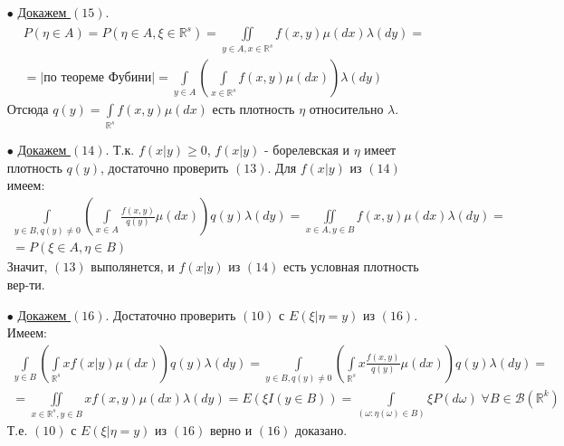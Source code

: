\begin{Proof}
	\begin{itemize}
		\item[$\bullet$] 
			\underline{Докажем $(15)$}.
			$$\begin{gathered}
				P(\eta \in A) = P(\eta \in A, \xi \in \mathbb{R}^s) = \underset{y \in A, x \in \mathbb{R}^s}{\overset{}{\iint}}f(x,y)\mu(d x) \lambda(d y) = \\
				= \Big|\text{по теореме Фубини}\Big| = \underset{y \in A}{\overset{}{\int}}\left( \underset{x \in \mathbb{R}^s}{\overset{}{\int}}f(x,y)\mu (d x) \right) \lambda (d y)
			\end{gathered}$$
			Отсюда $\displaystyle q(y) = \underset{\mathbb{R}^s}{\overset{}{\int}}f(x,y)\mu (d x)$ есть плотность $\eta$ относительно $\lambda$.
		\item[$\bullet$]
			\underline{Докажем $(14)$}.
			Т.к. $f(x|y) \ge 0$, $f(x|y)$ - борелевская и $\eta$ имеет плотность $q(y)$, достаточно проверить $(13)$. Для $f(x|y)$ из $(14)$ имеем:
			$$\begin{gathered}
				\underset{y \in B, q(y) \not = 0}{\overset{}{\int}}\left( \underset{x \in A}{\overset{}{\int}}\frac{f(x,y)}{q(y)}\mu (d x) \right) q(y) \lambda (d y) = \underset{x \in A, y \in B}{\overset{}{\iint}} f(x,y)\mu(d x)\lambda(d y) = \\
				= P(\xi \in A, \eta \in B)
			\end{gathered}$$
			Значит, $(13)$ выполянется, и $f(x|y)$ из $(14)$ есть условная плотность вер-ти.
		\item[$\bullet$]
			\underline{Докажем $(16)$}.
			Достаточно проверить $(10)$ с $E(\xi | \eta = y)$ из $(16)$. Имеем:
			$$\begin{gathered}
				\underset{y \in B}{\overset{}{\int}}\left( \underset{\mathbb{R}^s}{\overset{}{\int}} x f(x|y)\mu(d x) \right) q(y) \lambda(d y) = \underset{y \in B, q(y) \not = 0}{\overset{}{\int}}\left( \underset{\mathbb{R}^s}{\overset{}{\int}}x \frac{f(x,y)}{q(y)}\mu(d x) \right) q(y) \lambda(d y) = \\
				= \underset{x \in \mathbb{R}^s, y\in B}{\overset{}{\iint}} x f(x,y) \mu (d x) \lambda (d y) = E \left( \xi I(y \in B) \right) = \underset{\left( \omega: \eta (\omega) \in B \right)}{\overset{}{\int}}\xi P(d \omega) \; \forall B \in \mathcal{B}(\mathbb{R}^k)
			\end{gathered}$$
			Т.е. $(10)$ с $E(\xi | \eta = y)$ из $(16)$ верно и $(16)$ доказано.
	\end{itemize}
\end{Proof}


